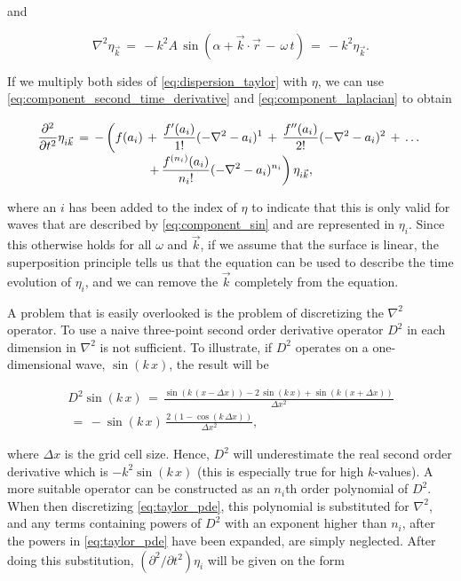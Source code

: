 and 

\begin{equation} \label{eq:component_laplacian}
\nabla^2\eta_{\vec{k}} \,=\, -k^2 A\,\sin(\alpha + \vec{k}\cdot\vec{r}\,-\,\omega\,t) \,=\, -k^2\eta_{\vec{k}}.
\end{equation}

If we multiply both sides of \eqref{eq:dispersion_taylor} with $\eta$, we can use \eqref{eq:component_second_time_derivative} and \eqref{eq:component_laplacian} to obtain

\begin{equation} \label{eq:taylor_pde}
\renewcommand*{\arraystretch}{2}
\begin{array}{c}
\displaystyle \frac{\partial^2}{\partial t^2}\eta_{i\vec{k}} \,=\, -\left(f(a_i) \,+\, \frac{f'(a_i)}{1!}(-\nabla^2-a_i)^1 \,+\, \frac{f''(a_i)}{2!}(-\nabla^2-a_i)^2 \,+\, \dots \right.\\
\displaystyle \left. +\, \frac{f^{(n_i)}(a_i)}{n_i!}(-\nabla^2-a_i)^{n_i}\right)\eta_{i\vec{k}},
\end{array}
\end{equation}

where an $i$ has been added to the index of $\eta$ to indicate that this \PDE is only valid for waves that are described by \eqref{eq:component_sin} and are represented in $\eta_i$. Since this \PDE otherwise holds for all $\omega$ and $\vec{k}$, if we assume that the surface is linear, the superposition principle tells us that the equation can be used to describe the time evolution of $\eta_i$, and we can remove the $\vec{k}$ completely from the equation.

A problem that is easily overlooked is the problem of discretizing the $\nabla^2$ operator. To use a naive three-point second order derivative operator $D^2$ in each dimension in $\nabla^2$ is not sufficient. To illustrate, if $D^2$ operates on a one-dimensional wave, $\sin(k\,x)$, the result will be

\begin{equation}
\renewcommand*{\arraystretch}{2}
\begin{array}{c}
\displaystyle D^2\sin(k\,x) \,=\, \frac{\sin(k\,(x-\Delta x)) - 2\,\sin(k\,x) + \sin(k\,(x+\Delta x))}{\Delta x^2} \\
\displaystyle \,=\, -\sin(k\,x)\,\frac{2\,(1-\cos(k\,\Delta x))}{\Delta x^2},
\end{array}
\end{equation}

where $\Delta x$ is the grid cell size. Hence, $D^2$ will underestimate the real second order derivative which is $-k^2\sin(k\,x)$ (this is especially true for high $k$-values). A more suitable operator can be constructed as an $n_i$th order polynomial of $D^2$. When then discretizing \eqref{eq:taylor_pde}, this polynomial is substituted for $\nabla^2$, and any terms containing powers of $D^2$ with an exponent higher than $n_i$, after the powers in \eqref{eq:taylor_pde} have been expanded, are simply neglected. After doing this substitution, $(\partial^2/\partial t^2)\eta_i$ will be given on the form

